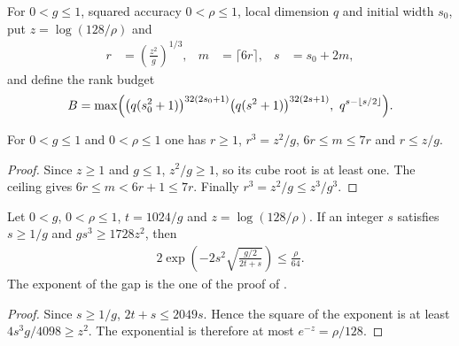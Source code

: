 \begin{definition}
    \label{def:aklv_ff_accuracy_parameters}
    \leanok
    For $0<g\le1$, squared accuracy $0<\rho\le1$, local dimension $q$ and
    initial width $s_0$, put $z=\log(128/\rho)$ and
    \begin{align*}
        r & =\left(\frac{z^2}{g}\right)^{1/3}, &
        m & =\lceil6r\rceil,                   &
        s & =s_0+2m,
    \end{align*}
    and define the rank budget
    \begin{align*}
        B=\max\Bigl(\bigl(q(s_0^2+1)\bigr)^{32(2s_0+1)}
        \bigl(q(s^2+1)\bigr)^{32(2s+1)},\ q^{s-\lfloor s/2\rfloor}\Bigr).
    \end{align*}
\end{definition}

\begin{lemma}
    \label{lem:aklv_ff_increment_bounds}
    \leanok
    For $0<g\le1$ and $0<\rho\le1$ one has
    $r\ge1$, $r^3=z^2/g$, $6r\le m\le7r$ and $r\le z/g$.
\end{lemma}
\begin{proof}
    \leanok
    Since $z\ge1$ and $g\le1$, $z^2/g\ge1$, so its cube root is at least one.
    The ceiling gives $6r\le m<6r+1\le7r$. Finally
    $r^3=z^2/g\le z^3/g^3$.
\end{proof}

\begin{lemma}
    \label{lem:aklv_ff_accuracy_shrink}
    \leanok
    Let $0<g$, $0<\rho\le1$, $t=1024/g$ and $z=\log(128/\rho)$. If an
    integer $s$ satisfies $s\ge1/g$ and $gs^3\ge1728z^2$, then
    \begin{align*}
        2\exp\left(-2s^2\sqrt{\frac{g/2}{2t+s}}\right)\le\frac{\rho}{64}.
    \end{align*}
    The exponent of the gap is the one of the proof of
    \cite[Theorem~4.3]{Arad2013AreaLaw}.
\end{lemma}
\begin{proof}
    \leanok
    Since $s\ge1/g$, $2t+s\le2049s$. Hence the square of the exponent is at
    least $4s^3g/4098\ge z^2$. The exponential is therefore at most
    $e^{-z}=\rho/128$.
\end{proof}

